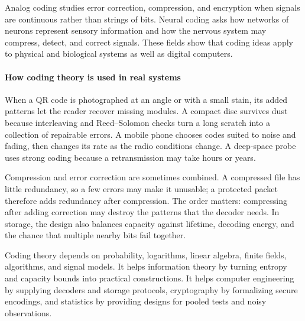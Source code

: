 Analog coding studies error correction, compression, and encryption when signals are continuous rather than strings of bits. Neural coding asks how networks of neurons represent sensory information and how the nervous system may compress, detect, and correct signals. These fields show that coding ideas apply to physical and biological systems as well as digital computers. \cite{coding_theory_ref9,coding_theory_ref10}

\paragraph{How coding theory is used in real systems}

When a QR code is photographed at an angle or with a small stain, its added patterns let the reader recover missing modules. A compact disc survives dust because interleaving and Reed--Solomon checks turn a long scratch into a collection of repairable errors. A mobile phone chooses codes suited to noise and fading, then changes its rate as the radio conditions change. A deep-space probe uses strong coding because a retransmission may take hours or years.

Compression and error correction are sometimes combined. A compressed file has little redundancy, so a few errors may make it unusable; a protected packet therefore adds redundancy after compression. The order matters: compressing after adding correction may destroy the patterns that the decoder needs. In storage, the design also balances capacity against lifetime, decoding energy, and the chance that multiple nearby bits fail together.

Coding theory depends on probability, logarithms, linear algebra, finite fields, algorithms, and signal models. It helps information theory by turning entropy and capacity bounds into practical constructions. It helps computer engineering by supplying decoders and storage protocols, cryptography by formalizing secure encodings, and statistics by providing designs for pooled tests and noisy observations. \cite{coding_theory_ref2,coding_theory_ref6}

